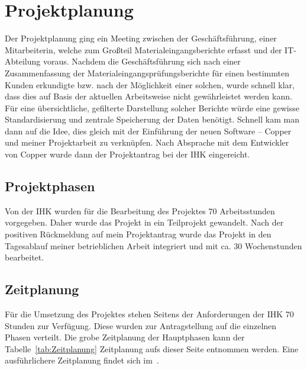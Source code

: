 \section{Projektplanung} 
\label{sec:Projektplanung}
Der Projektplanung ging ein Meeting zwischen der Geschäftsführung, einer Mitarbeiterin, welche zum Großteil Materialeingangsberichte erfasst und der IT-Abteilung voraus. Nachdem die Geschäftsführung sich nach einer Zusammenfassung der Materialeingangsprüfungsberichte für einen bestimmten Kunden erkundigte bzw. nach der Möglichkeit einer solchen, wurde schnell klar, dass dies auf Basis der aktuellen Arbeitsweise nicht gewährleistet werden kann. Für eine übersichtliche, gefilterte Darstellung solcher Berichte würde eine gewisse Standardisierung und zentrale Speicherung der Daten benötigt. Schnell kam man dann auf die Idee, dies gleich mit der Einführung der neuen Software – Copper und meiner Projektarbeit zu verknüpfen. Nach Absprache mit dem Entwickler von Copper wurde dann der Projektantrag bei der IHK eingereicht.

\subsection{Projektphasen}
\label{sec:Projektphasen}
Von der \ac{IHK} wurden für die Bearbeitung des Projektes 70 Arbeitsstunden vorgegeben. Daher wurde das Projekt in ein Teilprojekt gewandelt. Nach der positiven Rückmeldung auf mein Projektantrag wurde das Projekt in den Tagesablauf meiner betrieblichen Arbeit integriert und mit ca. 30 Wochenstunden bearbeitet.

\subsection{Zeitplanung}
\label{sec:Zeitplanung}
Für die Umsetzung des Projektes stehen Seitens der Anforderungen der \ac{IHK} 70 Stunden zur Verfügung. Diese wurden zur Antragstellung auf die einzelnen Phasen verteilt. Die grobe Zeitplanung der Hauptphasen kann der Tabelle~\ref{tab:Zeitplanung} Zeitplanung aufs dieser Seite entnommen werden. Eine ausführlichere Zeitplanung findet sich im~.


